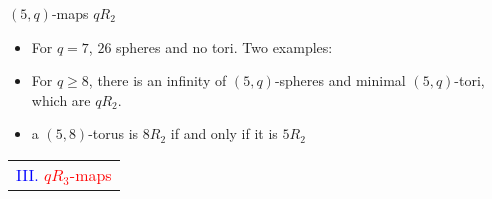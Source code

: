 \documentclass[%
pdf,
colorBG,
slideColor,
]{prosper}
\begin{document}
\begin{slide}{$(5,q)$-maps $qR_2$}
\begin{itemize}
\item For $q=7$, $26$ spheres and no tori. Two examples:
\begin{center}
\begin{minipage}{37mm}
\centering
{}\par
\end{minipage}
\begin{minipage}{37mm}
\centering
{}\par
\end{minipage}
\end{center}
\item For $q\geq 8$, there is an infinity of $(5,q)$-spheres
and minimal $(5,q)$-tori, which are $qR_2$.
\item a $(5,8)$-torus is $8R_2$ if and only if it is $5R_2$

\end{itemize}
\end{slide}
















\begin{slide}{}
\begin{center}
{\Huge 
\begin{tabular*}{7cm}{c}
\\[-0.5cm]
\textcolor{blue}{III. }\textcolor{red}{$qR_3$-maps}
\end{tabular*}
}
\end{center}
\end{slide}
\end{document}
